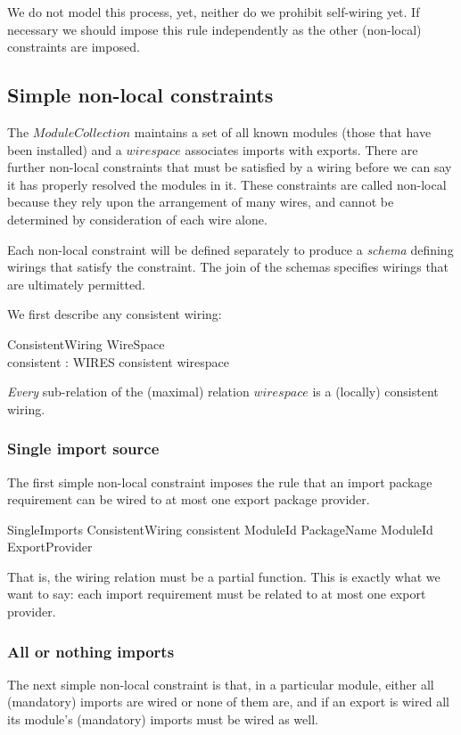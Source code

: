 \documentclass[a4paper,12pt]{article}
\begin{document}
We do not model this process, yet, neither do we prohibit self-wiring yet. If necessary we should impose this rule independently as the other (non-local) constraints are imposed.

\subsection{Simple non-local constraints}
The $ModuleCollection$ maintains a set of all known modules (those that have been installed) and a $wirespace$ associates imports with exports. There are further non-local constraints that must be satisfied by a wiring before we can say it has properly resolved the modules in it. These constraints are called non-local because they rely upon the arrangement of many wires, and cannot be determined by consideration of each wire alone.

Each non-local constraint will be defined separately to produce a \emph{schema} defining wirings that satisfy the constraint.  The join of the schemas specifies wirings that are ultimately permitted.

We first describe any consistent wiring:
\begin{schema}{ConsistentWiring}
	WireSpace \\
	consistent : WIRES 
\where
	consistent \subseteq wirespace
\end{schema}
\emph{Every} sub-relation of the (maximal) relation $wirespace$ is a (locally) consistent wiring.

\subsubsection*{Single import source}
The first simple non-local constraint imposes the rule that an import package requirement can be wired to at most one export package provider.

\begin{schema}{SingleImports}
	ConsistentWiring
\where
	consistent \in ModuleId \cross PackageName \pfun ModuleId \cross ExportProvider
\end{schema}
That is, the wiring relation must be a partial function. This is exactly what we want to say: each import requirement must be related to at most one export provider.

\subsubsection*{All or nothing imports}
The next simple non-local constraint is that, in a particular module, either all (mandatory) imports are wired or none of them are, and if an export is wired all its module's (mandatory) imports must be wired as well.
\end{document}
